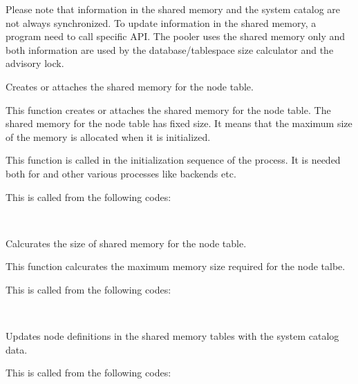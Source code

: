   Please note that information in the shared memory and the system catalog are not
  always synchronized.
  To update information in the shared memory, a program need to call specific API.
  The pooler uses the shared memory only and both information are used by the
  database/tablespace size calculator and the advisory lock.
  
  
    Creates or attaches the shared memory for the node table.
    
    This function creates or attaches the shared memory for the node table.
    The shared memory for the node table has fixed size.
    It means that the maximum size of the memory is allocated when it is initialized.
    
    This function is called in the initialization sequence of the process.
    It is needed both for  and other various processes like backends etc.
    
    This is called from the following codes:
    
    \FuncRefHdr
		\\ \hline
    \FuncRefTrailor
  
  
    Calcurates the size of shared memory for the node table.
    
    This function calcurates the maximum memory size required for the node talbe.
    
    This is called from the following codes:
    
    \FuncRefHdr
		\\ \hline
    \FuncRefTrailor
  
  
    Updates node definitions in the shared memory tables with the system catalog data.
    
    This is called from the following codes:
    
    \FuncRefHdr
		\\
		\\
		\\
		\hline
    \FuncRefTrailor
  
